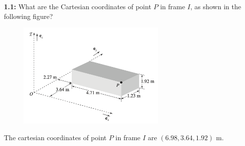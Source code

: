  

%
%

\newcommand{\hmwkTitle}{Homework 01}
\newcommand{\hmwkDueDate}{September 06, 2024}
\newcommand{\hmwkDueTime}{01:00 PM}
\newcommand{\hmwkClass}{ENAE 301}
\newcommand{\hmwkClassTime}{Section 0103}
\newcommand{\hmwkClassInstructor}{Dr. Paley}
\newcommand{\hmwkAuthorName}{\textbf{Vai Srivastava}}



\maketitle

\pagebreak

\begin{homeworkProblem}

	\textbf{1.1:} What are the Cartesian coordinates of point \( P \) in frame \( I \), as shown in the following figure?

	\begin{figure}[ht]
		\begin{center}
			\includegraphics[width=0.65\textwidth]{images/p1.png}
		\end{center}
	\end{figure}

	\solution

	The cartesian coordinates of point \( P \) in frame \( I \) are \( \left(6.98, 3.64, 1.92\right) \) m.

\end{homeworkProblem}

